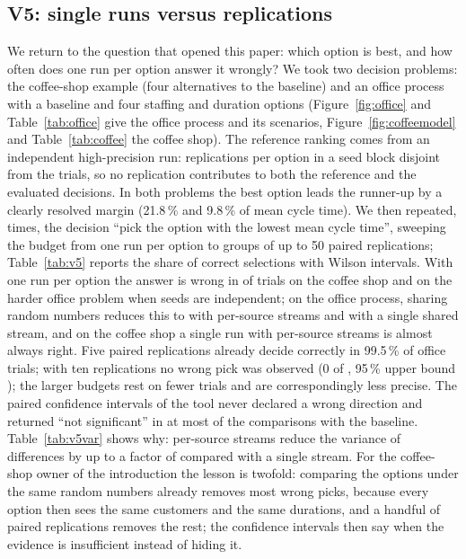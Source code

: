 \documentclass[preprint,12pt,nonatbib]{elsarticle}
\begin{document}
\subsection{V5: single runs versus replications}
\label{sec:v5}
We return to the question that opened this paper: which option is best, and how often does one run per option answer it wrongly? We took two decision problems: the coffee-shop example (four alternatives to the baseline) and an office process with a baseline and four staffing and duration options (Figure~\ref{fig:office} and Table~\ref{tab:office} give the office process and its scenarios, Figure~\ref{fig:coffeemodel} and Table~\ref{tab:coffee} the coffee shop). The reference ranking comes from an independent high-precision run: \VfiveRef{} replications per option in a seed block disjoint from the trials, so no replication contributes to both the reference and the evaluated decisions. In both problems the best option leads the runner-up by a clearly resolved margin (21.8\,\% and 9.8\,\% of mean cycle time). We then repeated, \VfiveN{} times, the decision ``pick the option with the lowest mean cycle time'', sweeping the budget from one run per option to groups of up to 50 paired replications; Table~\ref{tab:v5} reports the share of correct selections with Wilson intervals. With one run per option the answer is wrong in \VfiveCoffeeIndep{} of trials on the coffee shop and \VfiveOfficeIndep{} on the harder office problem when seeds are independent; on the office process, sharing random numbers reduces this to \VfiveOfficeKeyed{} with per-source streams and \VfiveOfficeSingle{} with a single shared stream, and on the coffee shop a single run with per-source streams is almost always right. Five paired replications already decide correctly in 99.5\,\% of office trials; with ten replications no wrong pick was observed (0 of \VfiveOfficeRepTrials{}, 95\,\% upper bound \VfiveOfficeRepUpper); the larger budgets rest on fewer trials and are correspondingly less precise. The paired confidence intervals of the tool never declared a wrong direction and returned ``not significant'' in at most \VfiveNs{} of the comparisons with the baseline. Table~\ref{tab:v5var} shows why: per-source streams reduce the variance of differences by up to a factor of \VfiveRatio{} compared with a single stream. For the coffee-shop owner of the introduction the lesson is twofold: comparing the options under the same random numbers already removes most wrong picks, because every option then sees the same customers and the same durations, and a handful of paired replications removes the rest; the confidence intervals then say when the evidence is insufficient instead of hiding it.
\end{document}
